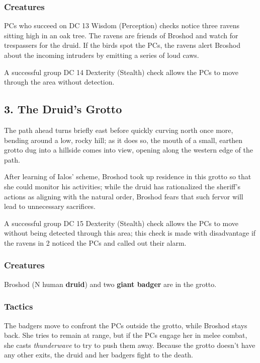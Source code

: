 \documentclass[10pt,a4paper,twoside,bg=print,twocolumn,openany,nodeprecatedcode]{dndbook}
\begin{document}
\subsubsection{Creatures}
PCs who succeed on DC 13 Wisdom (Perception) checks notice three ravens sitting high in an oak tree. The ravens are friends of Broshod and watch for trespassers for the druid. If the birds spot the PCs, the ravens alert Broshod about the incoming intruders by emitting a series of loud caws.

A successful group DC 14 Dexterity (Stealth) check allows the PCs to move through the area without detection.

\subsection{3. The Druid's Grotto}
\begin{DndReadAloud}{}
The path ahead turns briefly east before quickly curving north once more, bending around a low, rocky hill; as it does so, the mouth of a small, earthen grotto dug into a hillside comes into view, opening along the western edge of the path.

\end{DndReadAloud}

After learning of Ialos' scheme, Broshod took up residence in this grotto so that she could monitor his activities; while the druid has rationalized the sheriff's actions as aligning with the natural order, Broshod fears that such fervor will lead to unnecessary sacrifices.

A successful group DC 15 Dexterity (Stealth) check allows the PCs to move without being detected through this area; this check is made with disadvantage if the ravens in 2 noticed the PCs and called out their alarm.

\subsubsection{Creatures}
Broshod (N human \textbf{druid}) and two \textbf{giant badger} are in the grotto.

\subsubsection{Tactics}
The badgers move to confront the PCs outside the grotto, while Broshod stays back. She tries to remain at range, but if the PCs engage her in melee combat, she casts \textit{thunderwave} to try to push them away. Because the grotto doesn't have any other exits, the druid and her badgers fight to the death.
\end{document}
